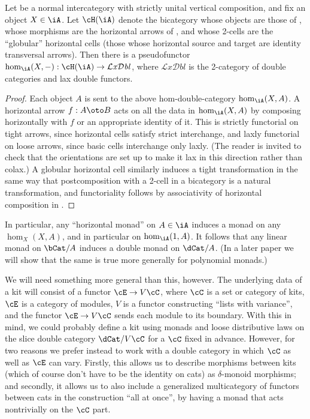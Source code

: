 \documentclass{amsart}
\newcommand{\C}{\cC}
\newcommand{\E}{\cE}
\newcommand{\dl}{\delta}
\def\lxdbl{\ensuremath{\mathcal{L}\mathit{x}\mathcal{D}\mathit{bl}}\xspace}
\begin{document}
\begin{lem}\label{thm:intercat-bicat}
  Let \iA be a normal intercategory with strictly unital vertical composition, and fix an object $X\in\iA$.
  Let $\cH(\iA)$ denote the bicategory whose objects are those of \iA, whose morphisms are the horizontal arrows of \iA, and whose 2-cells are the ``globular'' horizontal cells (those whose horizontal source and target are identity transversal arrows).
  Then there is a pseudofunctor $\hom_\iA(X,-) : \cH(\iA) \to \lxdbl$, where $\lxdbl$ is the 2-category of double categories and lax double functors.
\end{lem}
\begin{proof}
  Each object $A$ is sent to the above hom-double-category $\hom_\iA(X,A)$.
  A horizontal arrow $f:A\oto B$ acts on all the data in $\hom_\iA(X,A)$ by composing horizontally with $f$ or an appropriate identity of it.
  This is strictly functorial on tight arrows, since horizontal cells satisfy strict interchange, and laxly functorial on loose arrows, since basic cells interchange only laxly.
  (The reader is invited to check that the orientations are set up to make it lax in this direction rather than colax.)
  A globular horizontal cell similarly induces a tight transformation in the same way that postcomposition with a 2-cell in a bicategory is a natural transformation, and functoriality follows by associativity of horizontal composition in \iA.
\end{proof}

In particular, any ``horizontal monad'' on $A\in \iA$ induces a monad on any $\hom_X(X,A)$, and in particular on $\hom_\iA(1,A)$.
It follows that any linear monad on $\bCat/A$ induces a double monad on $\dCat/A$.
(In a later paper we will show that the same is true more generally for polynomial monads.)

We will need something more general than this, however.
The underlying data of a kit will consist of a functor $\E \to V\C$, where $\C$ is a set or category of kits, $\E$ is a category of modules, $V$ is a functor constructing ``lists with variance'', and the functor $\E \to V\C$ sends each module to its boundary.
With this in mind, we could probably define a kit using monads and loose distributive laws on the slice double category $\dCat/V\C$ for a $\C$ fixed in advance.
However, for two reasons we prefer instead to work with a double category in which $\C$ as well as $\E$ can vary.
Firstly, this allows us to describe morphisms between kits (which of course don't have to be the identity on cats) as $\dl$-monoid morphisms; and secondly, it allows us to also include a generalized multicategory of functors between cats in the construction ``all at once'', by having a monad that acts nontrivially on the $\C$ part.
\end{document}
